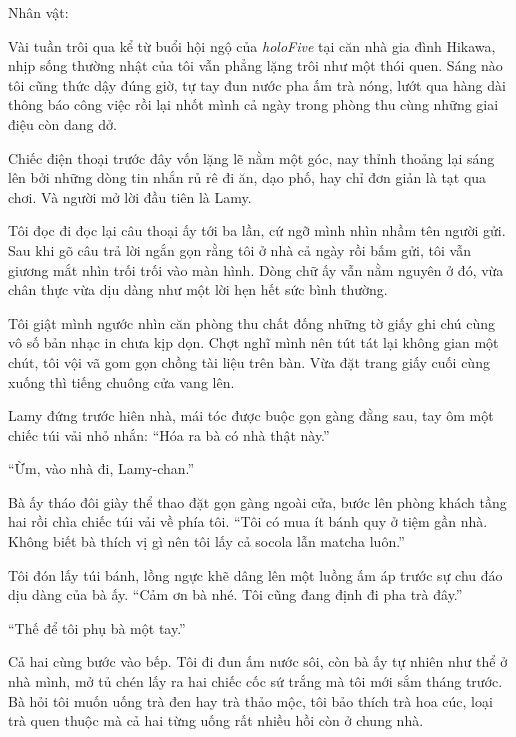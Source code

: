 \documentclass[../main.tex]{subfiles}
\begin{document}
\begin{center}
    {\caviar\fontsize{12pt}{12pt}\selectfont Nhân vật:  }
\end{center}

Vài tuần trôi qua kể từ buổi hội ngộ của \textit{holoFive} tại căn nhà gia đình Hikawa, nhịp sống thường nhật của tôi vẫn phẳng lặng trôi như một thói quen. Sáng nào tôi cũng thức dậy đúng giờ, tự tay đun nước pha ấm trà nóng, lướt qua hàng dài thông báo công việc rồi lại nhốt mình cả ngày trong phòng thu cùng những giai điệu còn dang dở.

Chiếc điện thoại trước đây vốn lặng lẽ nằm một góc, nay thỉnh thoảng lại sáng lên bởi những dòng tin nhắn rủ rê đi ăn, dạo phố, hay chỉ đơn giản là tạt qua chơi. Và người mở lời đầu tiên là Lamy.


Tôi đọc đi đọc lại câu thoại ấy tới ba lần, cứ ngỡ mình nhìn nhầm tên người gửi. Sau khi gõ câu trả lời ngắn gọn rằng tôi ở nhà cả ngày rồi bấm gửi, tôi vẫn giương mắt nhìn trối trối vào màn hình. Dòng chữ ấy vẫn nằm nguyên ở đó, vừa chân thực vừa dịu dàng như một lời hẹn hết sức bình thường.

Tôi giật mình ngước nhìn căn phòng thu chất đống những tờ giấy ghi chú cùng vô số bản nhạc in chưa kịp dọn. Chợt nghĩ mình nên tút tát lại không gian một chút, tôi vội vã gom gọn chồng tài liệu trên bàn. Vừa đặt trang giấy cuối cùng xuống thì tiếng chuông cửa vang lên.

Lamy đứng trước hiên nhà, mái tóc được buộc gọn gàng đằng sau, tay ôm một chiếc túi vải nhỏ nhắn: ``Hóa ra bà có nhà thật này.''

``Ừm, vào nhà đi, Lamy-chan.''

Bà ấy tháo đôi giày thể thao đặt gọn gàng ngoài cửa, bước lên phòng khách tầng hai rồi chìa chiếc túi vải về phía tôi. ``Tôi có mua ít bánh quy ở tiệm gần nhà. Không biết bà thích vị gì nên tôi lấy cả socola lẫn matcha luôn.''

Tôi đón lấy túi bánh, lồng ngực khẽ dâng lên một luồng ấm áp trước sự chu đáo dịu dàng của bà ấy. ``Cảm ơn bà nhé. Tôi cũng đang định đi pha trà đây.''

``Thế để tôi phụ bà một tay.''

Cả hai cùng bước vào bếp. Tôi đi đun ấm nước sôi, còn bà ấy tự nhiên như thể ở nhà mình, mở tủ chén lấy ra hai chiếc cốc sứ trắng mà tôi mới sắm tháng trước. Bà hỏi tôi muốn uống trà đen hay trà thảo mộc, tôi bảo thích trà hoa cúc, loại trà quen thuộc mà cả hai từng uống rất nhiều hồi còn ở chung nhà.
\end{document}
